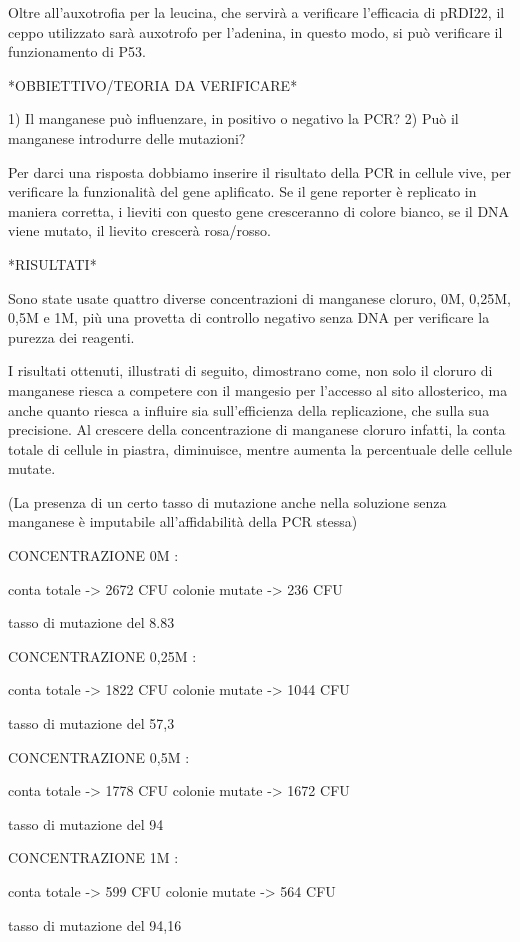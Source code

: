         Oltre all'auxotrofia per la leucina, che servirà a verificare l'efficacia di pRDI22, il ceppo utilizzato sarà auxotrofo per l'adenina, in questo modo, si può verificare
        il funzionamento di P53.


    *OBBIETTIVO/TEORIA DA VERIFICARE*

        1) Il manganese può influenzare, in positivo o negativo la PCR?
        2) Può il manganese introdurre delle mutazioni?

            Per darci una risposta dobbiamo inserire il risultato della PCR in cellule vive, per verificare la funzionalità del gene aplificato.
            Se il gene reporter è replicato in maniera corretta, i lieviti con questo gene cresceranno di colore bianco, se il DNA viene mutato, il lievito crescerà rosa/rosso.

    *RISULTATI*

        Sono state usate quattro diverse concentrazioni di manganese cloruro, 0M, 0,25M, 0,5M e 1M, più una provetta di controllo negativo senza DNA per verificare la
        purezza dei reagenti.

        I risultati ottenuti, illustrati di seguito, dimostrano come, non solo il cloruro di manganese riesca a competere con il mangesio per l'accesso al sito allosterico,
        ma anche quanto riesca a influire sia sull'efficienza della replicazione, che sulla sua precisione.
        Al crescere della concentrazione di manganese cloruro infatti, la conta totale di cellule in piastra, diminuisce, mentre aumenta la percentuale delle cellule mutate.

        (La presenza di un certo tasso di mutazione anche nella soluzione senza manganese è imputabile all'affidabilità della PCR stessa)

        CONCENTRAZIONE 0M :

            conta totale    -> 2672 CFU
            colonie mutate  -> 236 CFU

            tasso di mutazione del 8.83 %
        
        CONCENTRAZIONE 0,25M :

            conta totale    -> 1822 CFU
            colonie mutate  -> 1044 CFU

            tasso di mutazione del 57,3 %

        CONCENTRAZIONE 0,5M :

            conta totale    -> 1778 CFU
            colonie mutate  -> 1672 CFU

            tasso di mutazione del 94 %

        CONCENTRAZIONE 1M :

            conta totale    -> 599 CFU
            colonie mutate  -> 564 CFU

            tasso di mutazione del 94,16 %